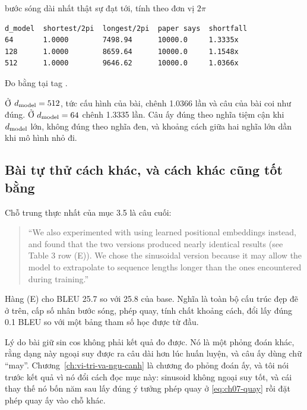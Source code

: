 \begin{measured}{bước sóng dài nhất thật sự đạt tới, tính theo đơn vị \(2\pi\)}
\begin{verbatim}
d_model  shortest/2pi  longest/2pi  paper says  shortfall
64       1.0000        7498.94      10000.0     1.3335x
128      1.0000        8659.64      10000.0     1.1548x
512      1.0000        9646.62      10000.0     1.0366x
\end{verbatim}

Đo bằng  tại tag .
\end{measured}

Ở \(d_{\mathrm{model}} = 512\), tức cấu hình của bài, chênh 1.0366 lần và câu của bài coi
như đúng. Ở \(d_{\mathrm{model}} = 64\) chênh 1.3335 lần. Câu ấy đúng theo nghĩa tiệm cận
khi \(d_{\mathrm{model}}\) lớn, không đúng theo nghĩa đen, và khoảng cách giữa hai nghĩa
lớn dần khi mô hình nhỏ đi.

\subsection*{Bài tự thử cách khác, và cách khác cũng tốt bằng}

%
Chỗ trung thực nhất của mục 3.5 là câu cuối:

\begin{quote}
\enquote{We also experimented with using learned positional embeddings instead,
and found that the two versions produced nearly identical results (see Table 3
row (E)). We chose the sinusoidal version because it may allow the model to
extrapolate to sequence lengths longer than the ones encountered during
training.}
\end{quote}

Hàng (E) cho BLEU 25.7 so với 25.8 của base. Nghĩa là toàn bộ cấu trúc đẹp đẽ ở
trên, cấp số nhân bước sóng, phép quay, tính chất khoảng cách, đổi lấy đúng 0.1
BLEU so với một bảng tham số học được từ đầu.

Lý do bài giữ sin cos không phải kết quả đo được. Nó là một phỏng đoán khác,
rằng dạng này ngoại suy được ra câu dài hơn lúc huấn luyện, và câu ấy dùng chữ
\enquote{may}. Chương~\ref{ch:vi-tri-va-ngu-canh} là chương đo phỏng đoán ấy, và
tôi nói trước kết quả vì nó đổi cách đọc mục này: sinusoid không ngoại suy tốt,
và cái thay thế nó bốn năm sau lấy đúng ý tưởng phép quay ở
\eqref{eq:ch07-quay} rồi đặt phép quay ấy vào chỗ khác.
